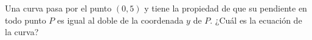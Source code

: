 \item Una curva pasa por el punto $(0, 5)$ y tiene la propiedad de que su pendiente en todo punto $P$ es igual al doble de la coordenada $y$ de $P$. ¿Cuál es la ecuación de la curva?
